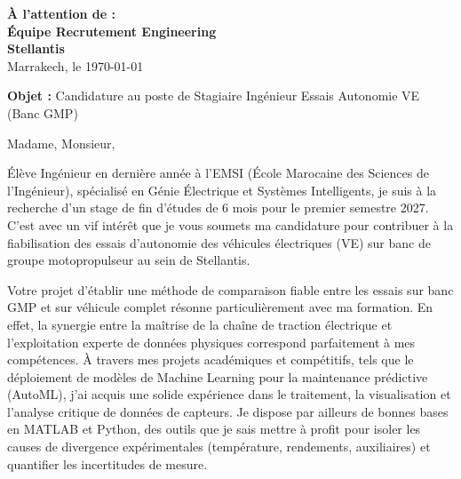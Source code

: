 \documentclass[10pt,a4paper]{altacv}
\makeatletter
\renewcommand{\makecvheader}{%
  \begingroup
    \raggedright\color{emphasis}%
    {\Huge\bfseries\MakeUppercase{\@name}\par}
    \medskip
    {\large\bfseries\color{accent}\@tagline\par}
    \medskip
    {\footnotesize\bfseries\@personalinfo\par}
  \endgroup\medskip
}
\makeatother
\begin{document}

\makecvheader

\bigskip

\begin{flushright}
  {\color{emphasis}\textbf{À l'attention de :}} \\[2pt]
  \textbf{Équipe Recrutement Engineering} \\
  \textbf{Stellantis} \\[20pt]
  Marrakech, le \today
\end{flushright}
\bigskip

\bigskip

{\color{accent}\textbf{Objet :}} Candidature au poste de Stagiaire Ingénieur Essais Autonomie VE (Banc GMP)

\bigskip\bigskip

Madame, Monsieur,

\vspace{0.4cm}

Élève Ingénieur en dernière année à l'EMSI (École Marocaine des Sciences de l'Ingénieur), spécialisé en Génie Électrique et Systèmes Intelligents, je suis à la recherche d'un stage de fin d'études de 6 mois pour le premier semestre 2027. C'est avec un vif intérêt que je vous soumets ma candidature pour contribuer à la fiabilisation des essais d'autonomie des véhicules électriques (VE) sur banc de groupe motopropulseur au sein de Stellantis. 

\vspace{0.4cm}

Votre projet d'établir une méthode de comparaison fiable entre les essais sur banc GMP et sur véhicule complet résonne particulièrement avec ma formation. En effet, la synergie entre la maîtrise de la chaîne de traction électrique et l'exploitation experte de données physiques correspond parfaitement à mes compétences. À travers mes projets académiques et compétitifs, tels que le déploiement de modèles de Machine Learning pour la maintenance prédictive (AutoML), j'ai acquis une solide expérience dans le traitement, la visualisation et l'analyse critique de données de capteurs. Je dispose par ailleurs de bonnes bases en MATLAB et Python, des outils que je sais mettre à profit pour isoler les causes de divergence expérimentales (température, rendements, auxiliaires) et quantifier les incertitudes de mesure.
\end{document}
